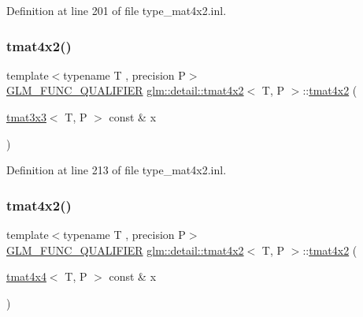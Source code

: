 Definition at line 201 of file type\+\_\+mat4x2.\+inl.

\mbox{\label{structglm_1_1detail_1_1tmat4x2_a1c7da56ef91ddbc093c429aa5e02da6b}} 
\subsubsection{\texorpdfstring{tmat4x2()}{tmat4x2()}\hspace{0.1cm}{\footnotesize\ttfamily [12/22]}}
{\footnotesize\ttfamily template$<$typename T , precision P$>$ \\
\hyperlink{setup_8hpp_a33fdea6f91c5f834105f7415e2a64407}{G\+L\+M\+\_\+\+F\+U\+N\+C\+\_\+\+Q\+U\+A\+L\+I\+F\+I\+ER} \hyperlink{structglm_1_1detail_1_1tmat4x2}{glm\+::detail\+::tmat4x2}$<$ T, P $>$\+::\hyperlink{structglm_1_1detail_1_1tmat4x2}{tmat4x2} (\begin{DoxyParamCaption}\item[{\hyperlink{structglm_1_1detail_1_1tmat3x3}{tmat3x3}$<$ T, P $>$ const \&}]{x }\end{DoxyParamCaption})\hspace{0.3cm}{\ttfamily [explicit]}}



Definition at line 213 of file type\+\_\+mat4x2.\+inl.

\mbox{\label{structglm_1_1detail_1_1tmat4x2_a5a1ee2297426e9d916cef04f76bf7030}} 
\subsubsection{\texorpdfstring{tmat4x2()}{tmat4x2()}\hspace{0.1cm}{\footnotesize\ttfamily [13/22]}}
{\footnotesize\ttfamily template$<$typename T , precision P$>$ \\
\hyperlink{setup_8hpp_a33fdea6f91c5f834105f7415e2a64407}{G\+L\+M\+\_\+\+F\+U\+N\+C\+\_\+\+Q\+U\+A\+L\+I\+F\+I\+ER} \hyperlink{structglm_1_1detail_1_1tmat4x2}{glm\+::detail\+::tmat4x2}$<$ T, P $>$\+::\hyperlink{structglm_1_1detail_1_1tmat4x2}{tmat4x2} (\begin{DoxyParamCaption}\item[{\hyperlink{structglm_1_1detail_1_1tmat4x4}{tmat4x4}$<$ T, P $>$ const \&}]{x }\end{DoxyParamCaption})\hspace{0.3cm}{\ttfamily [explicit]}}



